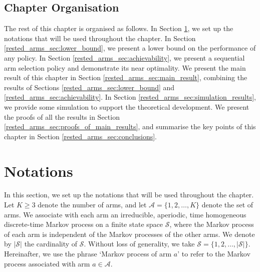 \subsection{Chapter Organisation}
The rest of this chapter is organised as follows. In Section \ref{rested_arms_sec:notations}, we set up the notations that will be used throughout the chapter. In Section \ref{rested_arms_sec:lower_bound}, we present a lower bound on the performance of any policy. In Section \ref{rested_arms_sec:achievability}, we present a sequential arm selection policy and demonstrate its near optimality. We present the main result of this chapter in Section \ref{rested_arms_sec:main_result}, combining the results of Sections \ref{rested_arms_sec:lower_bound} and \ref{rested_arms_sec:achievability}. In Section \ref{rested_arms_sec:simulation_results}, we provide some simulation to support the theoretical development. We present the proofs of all the results in Section \ref{rested_arms_sec:proofs_of_main_results}, and summarise the key points of this chapter in Section \ref{rested_arms_sec:conclusions}.

\section{Notations}
\label{rested_arms_sec:notations}
In this section, we set up the notations that will be used throughout the chapter. Let $K\geq 3$ denote the number of arms, and let $\mathcal{A}=\{1,2,\ldots,K\}$ denote the set of arms. We associate with each arm an irreducible, aperiodic, time homogeneous discrete-time Markov process on a finite state space $\mathcal{S}$, where the Markov process of each arm is independent of the Markov processes of the other arms. We denote by $|\mathcal{S}|$ the cardinality of $\mathcal{S}$. Without loss of generality, we take $\mathcal{S}=\{1,2,\ldots,|\mathcal{S}|\}$. Hereinafter, we use the phrase `Markov process of arm $a$' to refer to the Markov process associated with arm $a\in \mathcal{A}$.

